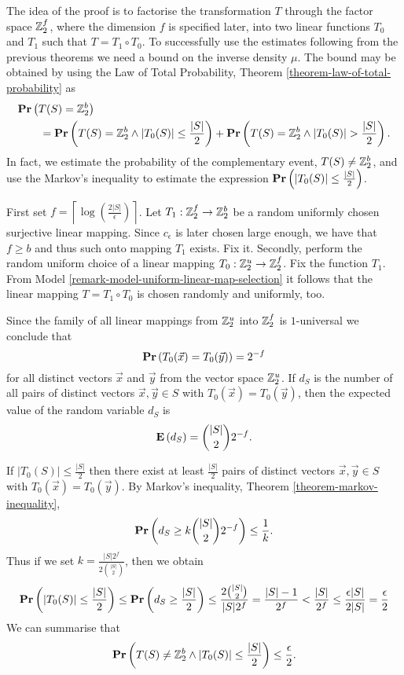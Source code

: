 The idea of the proof is to factorise the transformation $T$ through the factor space $\mathbb{Z}_{2}^{f}$, where the dimension $f$ is specified later, into two linear functions $T_0$ and $T_1$ such that $T = T_1 \circ T_0$. To successfully use the estimates following from the previous theorems we need a bound on the inverse density $\mu$. The bound may be obtained by using the Law of Total Probability, Theorem \ref{theorem-law-of-total-probability} as
\[
\begin{split}
& \mathbf{Pr}\left(T(S) = \mathbb{Z}_{2}^{b}\right) \\
& \qquad = \mathbf{Pr}\left(T(S) = \mathbb{Z}_{2}^{b} \wedge |T_0(S)| \leq \frac{|S|}{2}\right) + \mathbf{Pr}\left(T(S) = \mathbb{Z}_{2}^{b} \wedge |T_0(S)| > \frac{|S|}{2}\right) \text{.}
\end{split}
\]
In fact, we estimate the probability of the complementary event, $T(S) \neq \mathbb{Z}_{2}^{b}$, and use the Markov's inequality to estimate the expression $\mathbf{Pr}\left(|T_0(S)| \leq \frac{|S|}{2}\right)$.

First set $f = \left\lceil\log(\frac {2|S|}{\epsilon})\right\rceil$. Let $T_1: \mathbb{Z}_{2}^{f} \rightarrow \mathbb{Z}_{2}^{b}$ be a random uniformly chosen surjective linear mapping. Since $c_\epsilon$ is later chosen large enough, we have that $f \geq b$ and thus such onto mapping $T_1$ exists. Fix it. Secondly, perform the random uniform choice of a linear mapping $T_0: \mathbb{Z}_{2}^{u} \rightarrow \mathbb{Z}_{2}^{f}$. Fix the function $T_1$. From Model \ref{remark-model-uniform-linear-map-selection} it follows that the linear mapping $T = T_1 \circ T_0$ is chosen randomly and uniformly, too.

Since the family of all linear mappings from $\mathbb{Z}_{2}^{u}$ into $\mathbb{Z}_{2}^{f}$ is $1$-universal we conclude that \[ \mathbf{Pr}\left(T_0(\vec{x}) = T_0(\vec{y})\right) = 2 ^ {-f} \] for all distinct vectors $\vec {x}$ and $\vec {y}$ from the vector space $\mathbb{Z}_{2}^{u}$. If $d_S$ is the number of  all pairs of distinct vectors $\vec {x},\vec {y}\in S$ with $T_0(\vec {x}) = T_0(\vec {y})$, then the expected value of the random variable $d_S$ is \[ \mathbf{E}\left(d_S\right)= \binom{|S|}{2} 2 ^ {-f} \text{.} \]

If $|T_0(S)| \leq \frac {|S|}{2}$ then there exist at least $\frac {|S|}{2}$ pairs of distinct vectors $\vec{x}, \vec{y} \in S$ with $T_0(\vec {x}) = T_0(\vec {y})$. By Markov's inequality, Theorem \ref{theorem-markov-inequality}, \[ \mathbf{Pr}\left(d_S \geq k\binom {|S|}{2} 2^{-f}\right) \leq \frac{1}{k} \text{.} \]
Thus if we set $k = \frac {|S|2 ^ f}{2\binom {|S|}{2}}$, then we obtain 
\[ 
	\mathbf{Pr}\left(|T_0(S)| \leq \frac {|S|}{2}\right) 
		\leq \mathbf{Pr}\left(d_S \geq \frac {|S|}{2}\right) 
		\leq \frac{2 \binom{|S|}{2}}{|S|2 ^ f} = \frac{|S| - 1}{2 ^ f} < \frac{|S|}{2 ^ f} 
		\leq \frac{\epsilon |S|}{2|S|} = \frac{\epsilon}{2}
\]
We can summarise that
\[ 
\mathbf{Pr}\left(T(S) \neq \mathbb{Z}_{2}^{b} \wedge |T_0(S)| \leq \frac{|S|}{2}\right) \leq \frac{\epsilon}{2} \text{.}
\]

